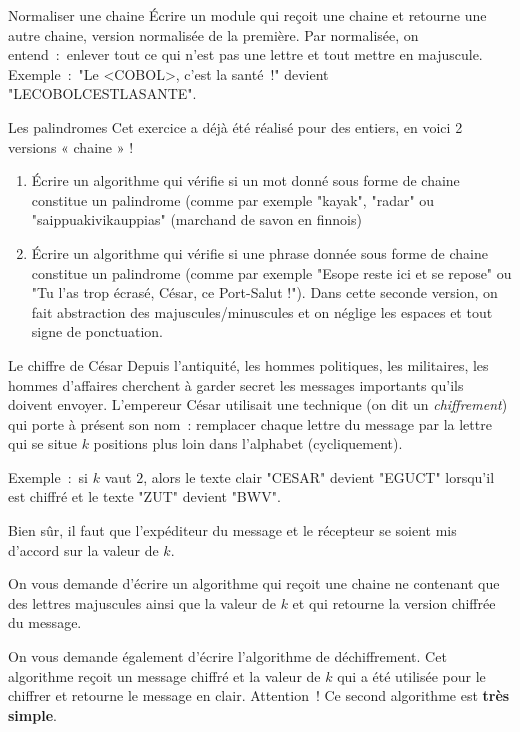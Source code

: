 	\begin{Exercice}{Normaliser une chaine}
		Écrire un module qui reçoit une chaine et retourne une autre chaine,
		version normalisée de la première.
		Par normalisée, on entend~:~enlever tout ce qui n'est pas une lettre 
		et tout mettre en majuscule.
		\\Exemple~:~"Le <COBOL>, c'est la santé~!" devient "LECOBOLCESTLASANTE".
	\end{Exercice}
		
	\begin{Exercice}{Les palindromes}
		Cet exercice a déjà été réalisé pour des entiers, 
		en voici 2 versions « chaine » ! 
		\begin{enumerate}[label=\alph*)]
		\item 
			Écrire un algorithme qui vérifie 
			si un mot donné sous forme de chaine 
			constitue un palindrome 
			(comme par exemple "kayak", "radar" ou "saippuakivikauppias" 
			(marchand de savon en finnois)
		\item
			Écrire un algorithme qui vérifie 
			si une phrase donnée sous forme de chaine constitue un palindrome 
			(comme par exemple "Esope reste ici et se repose" 
			ou "Tu l'as trop écrasé, César, ce Port-Salut !"). 
			Dans cette seconde version, 
			on fait abstraction des majuscules/minuscules 
			et on néglige les espaces et tout signe de ponctuation.
		\end{enumerate}
	\end{Exercice}
	
	\begin{Exercice}{Le chiffre de César}
		\label{ex:cesar}
		Depuis l'antiquité, les hommes politiques, les militaires, 
		les hommes d'affaires cherchent à garder secret les messages
		importants qu'ils doivent envoyer.
		L'empereur César utilisait une technique (on dit un \emph{chiffrement})
		qui porte à présent son nom~:
		remplacer chaque lettre du message par la lettre qui se situe 
		$k$ positions plus loin dans l'alphabet (cycliquement).
		
		Exemple~:~si $k$ vaut $2$, 
		alors le texte clair "CESAR" devient "EGUCT" lorsqu'il est chiffré 
		et le texte "ZUT" devient "BWV".
		
		Bien sûr, il faut que l'expéditeur du message et le récepteur
		se soient mis d'accord sur la valeur de $k$.
		
		On vous demande d'écrire un algorithme qui reçoit une chaine ne contenant
		que des lettres majuscules ainsi que la valeur de $k$ et qui retourne
		la version chiffrée du message.
	
		On vous demande également d'écrire l'algorithme de déchiffrement.
		Cet algorithme reçoit un message chiffré et la valeur de $k$ qui a été
		utilisée pour le chiffrer et retourne le message en clair.
		Attention~! Ce second algorithme est \textbf{très simple}.
	\end{Exercice}

